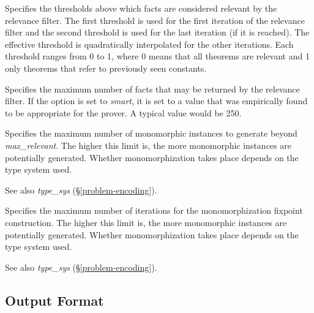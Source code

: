 \documentclass[a4paper,12pt]{article}
\begin{document}
\begin{enum}
Specifies the thresholds above which facts are considered relevant by the
relevance filter. The first threshold is used for the first iteration of the
relevance filter and the second threshold is used for the last iteration (if it
is reached). The effective threshold is quadratically interpolated for the other
iterations. Each threshold ranges from 0 to 1, where 0 means that all theorems
are relevant and 1 only theorems that refer to previously seen constants.

Specifies the maximum number of facts that may be returned by the relevance
filter. If the option is set to \textit{smart}, it is set to a value that was
empirically found to be appropriate for the prover. A typical value would be
250.

Specifies the maximum number of monomorphic instances to generate beyond
\textit{max\_relevant}. The higher this limit is, the more monomorphic instances
are potentially generated. Whether monomorphization takes place depends on the
type system used.

\nopagebreak
{\small See also \textit{type\_sys} (\S\ref{problem-encoding}).}

Specifies the maximum number of iterations for the monomorphization fixpoint
construction. The higher this limit is, the more monomorphic instances are
potentially generated. Whether monomorphization takes place depends on the
type system used.

\nopagebreak
{\small See also \textit{type\_sys} (\S\ref{problem-encoding}).}
\end{enum}

\subsection{Output Format}
\label{output-format}
\end{document}
